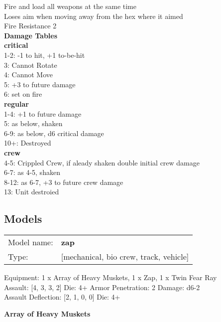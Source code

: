 Fire and load all weapons at the same time\\ 
Loses aim when moving away from the hex where it aimed\\ 
Fire Resistance 2\\ 



{\bf Damage Tables} \\
 {\bf critical } \\
1-2: -1 to hit, +1 to-be-hit \\
3: Cannot Rotate \\
4: Cannot Move \\
5: +3 to future damage \\
6: set on fire \\
 {\bf regular } \\
1-4: +1 to future damage \\
5: as below, shaken \\
6-9: as below, d6 critical damage \\
10+: Destroyed \\
 {\bf crew } \\
4-5: Crippled Crew, if aleady shaken double initial crew damage \\
6-7: as 4-5, shaken \\
8-12: as 6-7, +3 to future crew damage \\
13: Unit destroied \\


\pagebreak

\subsection{ Models }

\begin{tabular}{ll}
Model name: & {\bf zap } \\
Type: & [mechanical, bio crew, track, vehicle] \\
\end{tabular}

Equipment: 1 x Array of Heavy Muskets, 1 x Zap, 1 x Twin Fear Ray \\

Assault: [4, 3, 3, 2] Die: 4+ Armor Penetration: 2 Damage: d6-2 \\
Assault Deflection: [2, 1, 0, 0] Die: 4+\\
\indent  



{\bf Array of Heavy Muskets } \\




